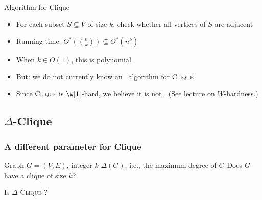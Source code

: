\begin{frame}{Algorithm for Clique}
 \begin{itemize}
  \item For each subset $S\subseteq V$ of size $k$, check whether all vertices of $S$ are adjacent
  \item Running time: $O^*\left( \binom{n}{k} \right) \subseteq O^*(n^k)$
  \item When $k\in O(1)$, this is polynomial
  \item But: we do not currently know an \FPT\ algorithm for \textsc{Clique}
  \item Since \textsc{Clique} is $\W[1]$-hard, we believe it is not \FPT. (See lecture on $W$-hardness.)
 \end{itemize}
\end{frame}

\subsection{$\Delta$-Clique}

\begin{frame}
 \frametitle{A different parameter for Clique}
 
  {Graph $G=(V,E)$, integer $k$}
  {$\Delta(G)$, i.e., the maximum degree of $G$}
  {Does $G$ have a clique of size $k$?}
 
\begin{center}
\end{center}

\noindent
Is $\Delta$-\textsc{Clique} \FPT?
\end{frame}

